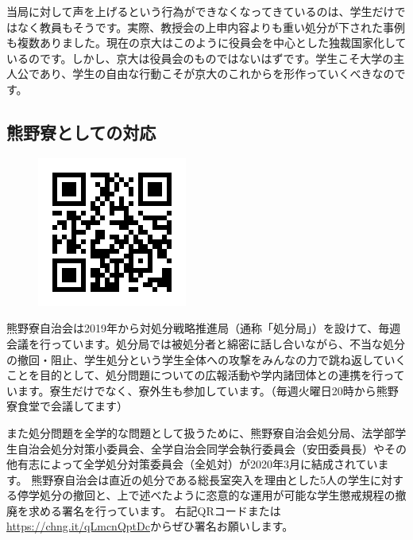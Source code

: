 当局に対して声を上げるという行為ができなくなってきているのは、学生だけではなく教員もそうです。実際、教授会の上申内容よりも重い処分が下された事例も複数ありました。現在の京大はこのように役員会を中心とした独裁国家化しているのです。しかし、京大は役員会のものではないはずです。学生こそ大学の主人公であり、学生の自由な行動こそが京大のこれからを形作っていくべきなのです。


\subsection{熊野寮としての対応}

\begin{figure}
    \vspace*{-8mm}
    \includegraphics[width=8zw]{gazo/zenshotaishomei.png}
\end{figure}

熊野寮自治会は2019年から対処分戦略推進局（通称「処分局」）を設けて、毎週会議を行っています。処分局では被処分者と綿密に話し合いながら、不当な処分の撤回・阻止、学生処分という学生全体への攻撃をみんなの力で跳ね返していくことを目的として、処分問題についての広報活動や学内諸団体との連携を行っています。寮生だけでなく、寮外生も参加しています。（毎週火曜日20時から熊野寮食堂で会議してます）

また処分問題を全学的な問題として扱うために、熊野寮自治会処分局、法学部学生自治会処分対策小委員会、全学自治会同学会執行委員会（安田委員長）やその他有志によって全学処分対策委員会（全処対）が2020年3月に結成されています。
熊野寮自治会は直近の処分である総長室突入を理由とした5人の学生に対する停学処分の撤回と、上で述べたように恣意的な運用が可能な学生懲戒規程の撤廃を求める署名を行っています。
右記QRコードまたは\url{https://chng.it/qLmcnQptDc}からぜひ署名お願いします。

